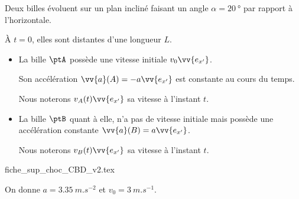 \initialisationPartieGauche %
Deux billes évoluent sur un plan incliné faisant un angle $\alpha=\SI{20}{\degree}$ par rapport à l'horizontale. 

À $t=0$, elles sont distantes d'une longueur $L$.

\begin{itemize}
\item
La bille $\ptA$ possède une vitesse initiale 
$v_0 \vv{e_{x'}}$.

Son accélération $\vv{a}(A) =-a\vv{e_{x'}}$ est constante au cours du temps. 

Nous noterons  
$v_A(t)  \vv{e_{x'}}$ sa vitesse à l'instant $t$.  
\smallskip

\item
La bille $\ptB$ quant à elle, n'a pas de vitesse initiale mais possède une accélération constante $\vv{a}(B) =a\vv{e_{x'}}$. 

Nous noterons  $v_B(t)  \vv{e_{x'}}$ sa vitesse à l'instant $t$. 
\end{itemize}


\initialisationPartieDroite %
\begin{center}
	{fiche_sup_choc_CBD_v2.tex}
\end{center}
\finalisationDuPartageDePage %

\medskip
On donne  $a=\SI{3,35}{m.s^{-2}}$ et $v_0=\SI{3}{m.s^{-1}}$.


